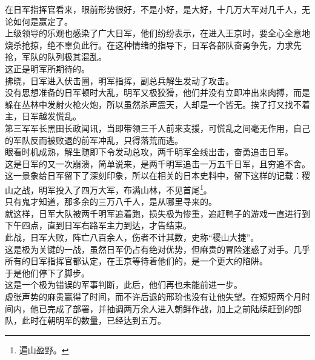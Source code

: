 \begin{multicols}{\theparacolNo}
在日军指挥官看来，眼前形势很好，不是小好，是大好，十几万大军对几千人，无论如何是赢定了。\\

上级领导的乐观也感染了广大日军，他们纷纷表示，在进入王京时，要全心全意地烧杀抢掠，绝不辜负此行。在这种情绪的指导下，日军各部队奋勇争先，力求先抢，军队的队列极其混乱。\\

这正是明军所期待的。\\

拂晓，日军进入伏击圈，明军指挥，副总兵解生发动了攻击。\\

没有思想准备的日军顿时大乱，明军又极狡猾，他们并没有立即冲出来肉搏，而是躲在丛林中发射火枪火炮，所以虽然杀声震天，人却是一个皆无。挨了打又找不着主，日军越发慌乱。\\

第三军军长黑田长政闻讯，当即带领三千人前来支援，可慌乱之间毫无作用，自己的军队反而被败退的前军冲乱，只得落荒而逃。\\

眼看时机成熟，解生随即下令发动总攻，两千明军全线出击，奋勇追击日军。\\

这是日军的又一次崩溃，简单说来，是两千明军追击一万五千日军，且穷追不舍。这一景象给日军留下了深刻印象，所以在相关的日本史料中，留下这样的记载：稷山之战，明军投入了四万大军，布满山林，不见首尾\footnote{遍山盈野。}。\\

只有鬼才知道，那多余的三万八千人，是从哪里寻来的。\\

就这样，日军大队被两千明军追着跑，损失极为惨重，追赶鸭子的游戏一直进行到下午四点，直到日军右路军主力到达，才告结束。\\

此战，日军大败，阵亡八百余人，伤者不计其数，史称“稷山大捷”。\\

这是极为关键的一战，虽然日军仍占有绝对优势，但麻贵的冒险迷惑了对手。几乎所有的日军指挥官都认定，在王京等待着他们的，是一个更大的陷阱。\\

于是他们停下了脚步。\\

这是一个极为错误的军事判断，此后，他们再也未能前进一步。\\

虚张声势的麻贵赢得了时间，而不许后退的邢玠也没有让他失望。在短短两个月时间内，他已完成了部署，并抽调两万余人进入朝鲜作战，加上之前陆续赶到的部队，此时在朝明军的数量，已经达到五万。\\


\end{multicols}
